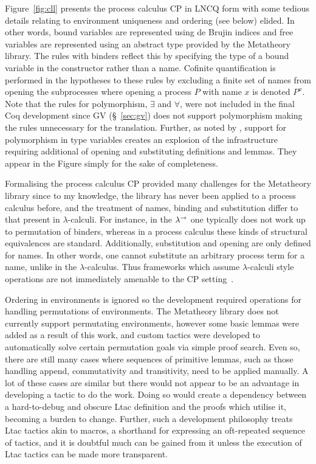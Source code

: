 Figure~\ref{fig:cll} presents the process calculus CP in LNCQ form with some
tedious details relating to environment uniqueness and ordering (see below)
elided. In other words, bound variables are represented using de Brujin
indices and free variables are represented using an abstract type provided by
the Metatheory library. The rules with binders reflect this by specifying the
type of a bound variable in the constructor rather than a name. Cofinite
quantification is performed in the hypotheses to these rules by excluding a
finite set of names from opening the subprocesses where opening a process $P$
with name $x$ is denoted $P^x$. Note that the rules for polymorphism,
$\exists$ and $\forall$, were not included in the final Coq development since
GV (\S~\ref{sec:gv}) does not support polymorphism making the rules
unnecessary for the translation. Further, as noted by \citeauthor{Lee:2012},
support for polymorphism in type variables creates an explosion of the
infrastructure requiring additional of opening and substituting definitions
and lemmas. They appear in the Figure simply for the sake of completeness.

Formalising the process calculus CP provided many challenges for the
Metatheory library since to my knowledge, the library has never been applied
to a process calculus before, and the treatment of names, binding and
substitution differ to that present in $\lambda$-calculi. For instance, in the
$\lambda^\rightarrow$ one typically does not work up to permutation of binders, whereas in a
process calculus these kinds of structural equivalences are
standard. Additionally, substitution and opening are only defined for
names. In other words, one cannot substitute an arbitrary process term for a
name, unlike in the $\lambda$-calculus. Thus frameworks which assume
$\lambda$-calculi style operations are not immediately amenable to the CP
setting~\cite{Lee:2012}.

Ordering in environments is ignored so the development required operations for
handling permutations of environments. The Metatheory library does not
currently support permutating environments, however some basic lemmas were
added as a result of this work, and custom tactics were developed to
automatically solve certain permutation goals via simple proof search. Even
so, there are still many cases where sequences of primitive lemmas, such as
those handling append, commutativity and transitivity, need to be applied
manually. A lot of these cases are similar but there would not appear to be an
advantage in developing a tactic to do the work. Doing so would create a
dependency between a hard-to-debug and obscure Ltac definition and the proofs
which utilise it, becoming a burden to change. Further, such a development
philosophy treats Ltac tactics akin to macros, a shorthand for expressing an
oft-repeated sequence of tactics, and it is doubtful much can be gained from
it unless the execution of Ltac tactics can be made more transparent.

